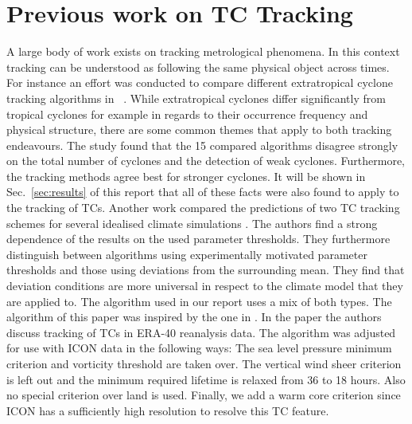 \section{Previous work on TC Tracking}\label{sec:tracking}
A large body of work exists on tracking metrological phenomena. In this context tracking can be understood as following the same physical object across times.\newline
For instance an effort was conducted to compare different extratropical cyclone tracking algorithms in ~\cite{extratropical}. While extratropical cyclones differ significantly from tropical cyclones for example in regards to their occurrence frequency and physical structure, there are some common themes that apply to both tracking endeavours. The study found that the 15 compared algorithms disagree strongly on the total number of cyclones and the detection of weak cyclones. Furthermore, the tracking methods agree best for stronger cyclones. It will be shown in Sec.~\ref{sec:results} of this report that all of these facts were also found to apply to the tracking of TCs.\newline
Another work compared the predictions of two TC tracking schemes for several idealised climate simulations \cite{comp-climate-schemes}. The authors find a strong dependence of the results on the used parameter thresholds. They furthermore distinguish between algorithms using experimentally motivated parameter thresholds and those using deviations from the surrounding mean. They find that deviation conditions are more universal in respect to the climate model that they are applied to. The algorithm used in our report uses a mix of both types.\newline
The algorithm of this paper was inspired by the one in \cite{orig-tracking}. In the paper the authors discuss tracking of TCs in ERA-40 reanalysis data. The algorithm was adjusted for use with ICON data in the following ways: The sea level pressure minimum criterion and vorticity threshold are taken over. The vertical wind sheer criterion is left out and the minimum required lifetime is relaxed from 36 to 18 hours. Also no special criterion over land is used. Finally, we add a warm core criterion since ICON has a sufficiently high resolution to resolve this TC feature.